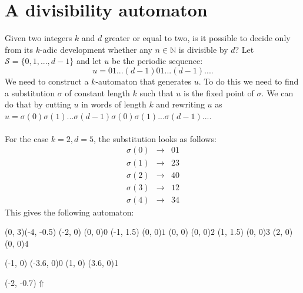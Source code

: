 \documentclass{article}
\begin{document}
\section*{A divisibility automaton}
Given two integers $k$ and $d$ greater or equal to two, is it possible to
decide only from its $k$-adic development whether any $n \in \mathbb{N}$ is
divisible by $d$? Let $\mathcal{S} = \{0, 1, ..., d - 1\}$ and let $u$ be the
periodic sequence:
\begin{displaymath}
  u = 01...(d - 1)01...(d - 1)... .
\end{displaymath}
We need to construct a $k$-automaton that generates $u$. To do this we need to
find a substitution $\sigma$ of constant length $k$ such that $u$ is the fixed
point of $\sigma$. We can do that by cutting $u$ in words of length $k$ and
rewriting $u$ as
$u = \sigma(0)\sigma(1)...\sigma(d - 1)\sigma(0)\sigma(1)...\sigma(d - 1)...$.\\
\\
For the case $k = 2, d = 5$, the substitution looks as follows: \newpage
\begin{eqnarray*}
  \sigma(0) &\rightarrow& 01\\
  \sigma(1) &\rightarrow& 23\\
  \sigma(2) &\rightarrow& 40\\
  \sigma(3) &\rightarrow& 12\\
  \sigma(4) &\rightarrow& 34
\end{eqnarray*}
This gives the following automaton:\\
\begin{graph}(0, 3)(-4, -0.5)
  (-2, 0) (0, 0){$0$}
  (-1, 1.5) (0, 0){$1$}
  (0, 0) (0, 0){$2$}
  (1, 1.5) (0, 0){$3$}
  (2, 0) (0, 0){$4$}

  (-1, 0) \freetext(-3.6, 0){0}
   
   
   
   
   
   
   
   
  (1, 0) \freetext(3.6, 0){1}

  \freetext(-2, -0.7){$\Uparrow$}
\end{graph}\\
\end{document}
